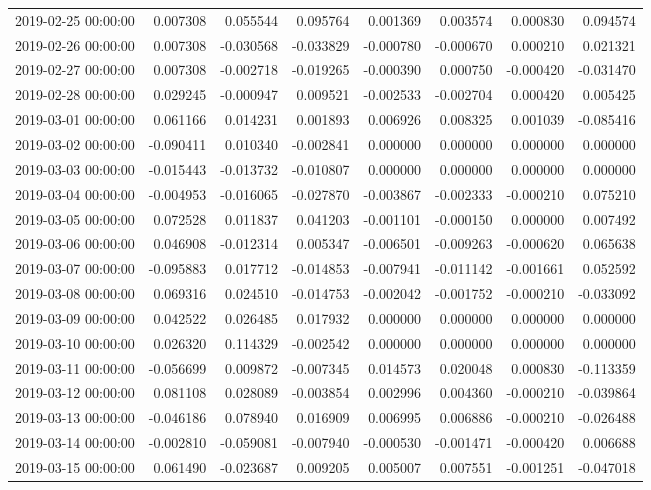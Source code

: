 \begin{tabular}{lrrrrrrr}
2019-02-25 00:00:00 & 0.007308 & 0.055544 & 0.095764 & 0.001369 & 0.003574 & 0.000830 & 0.094574 \\
2019-02-26 00:00:00 & 0.007308 & -0.030568 & -0.033829 & -0.000780 & -0.000670 & 0.000210 & 0.021321 \\
2019-02-27 00:00:00 & 0.007308 & -0.002718 & -0.019265 & -0.000390 & 0.000750 & -0.000420 & -0.031470 \\
2019-02-28 00:00:00 & 0.029245 & -0.000947 & 0.009521 & -0.002533 & -0.002704 & 0.000420 & 0.005425 \\
2019-03-01 00:00:00 & 0.061166 & 0.014231 & 0.001893 & 0.006926 & 0.008325 & 0.001039 & -0.085416 \\
2019-03-02 00:00:00 & -0.090411 & 0.010340 & -0.002841 & 0.000000 & 0.000000 & 0.000000 & 0.000000 \\
2019-03-03 00:00:00 & -0.015443 & -0.013732 & -0.010807 & 0.000000 & 0.000000 & 0.000000 & 0.000000 \\
2019-03-04 00:00:00 & -0.004953 & -0.016065 & -0.027870 & -0.003867 & -0.002333 & -0.000210 & 0.075210 \\
2019-03-05 00:00:00 & 0.072528 & 0.011837 & 0.041203 & -0.001101 & -0.000150 & 0.000000 & 0.007492 \\
2019-03-06 00:00:00 & 0.046908 & -0.012314 & 0.005347 & -0.006501 & -0.009263 & -0.000620 & 0.065638 \\
2019-03-07 00:00:00 & -0.095883 & 0.017712 & -0.014853 & -0.007941 & -0.011142 & -0.001661 & 0.052592 \\
2019-03-08 00:00:00 & 0.069316 & 0.024510 & -0.014753 & -0.002042 & -0.001752 & -0.000210 & -0.033092 \\
2019-03-09 00:00:00 & 0.042522 & 0.026485 & 0.017932 & 0.000000 & 0.000000 & 0.000000 & 0.000000 \\
2019-03-10 00:00:00 & 0.026320 & 0.114329 & -0.002542 & 0.000000 & 0.000000 & 0.000000 & 0.000000 \\
2019-03-11 00:00:00 & -0.056699 & 0.009872 & -0.007345 & 0.014573 & 0.020048 & 0.000830 & -0.113359 \\
2019-03-12 00:00:00 & 0.081108 & 0.028089 & -0.003854 & 0.002996 & 0.004360 & -0.000210 & -0.039864 \\
2019-03-13 00:00:00 & -0.046186 & 0.078940 & 0.016909 & 0.006995 & 0.006886 & -0.000210 & -0.026488 \\
2019-03-14 00:00:00 & -0.002810 & -0.059081 & -0.007940 & -0.000530 & -0.001471 & -0.000420 & 0.006688 \\
2019-03-15 00:00:00 & 0.061490 & -0.023687 & 0.009205 & 0.005007 & 0.007551 & -0.001251 & -0.047018 \\

\end{tabular}
